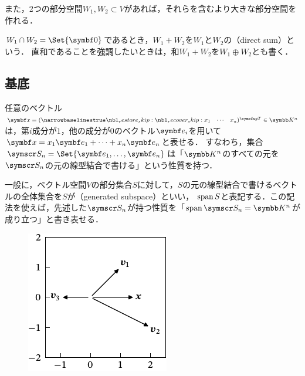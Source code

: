 \documentclass[../../main]{subfiles}
\begin{document}
また，2つの部分空間\(W_1,W_2\subset V\)があれば，それらを含むより大きな部分空間を作れる．


\(W_1\cap W_2=\Set{\zvec}\)であるとき，\(W_1+W_2\)を\(W_1\)と\(W_2\)の（direct sum）という．
直和であることを強調したいときは，和\(W_1+W_2\)を\(W_1\oplus W_2\)とも書く．

\subsection{基底}

任意のベクトル\(\vect{x}=\trps{\rowvect{x_1 & \cdots & x_n}}\in\numset{K}^n\)は，第\(i\)成分が\(1\)，他の成分が\(0\)のベクトル\(\vect{e}_i\)を用いて\(\vect{x}=x_1\vect{e}_1+\dots+x_n\vect{e}_n\)と表せる．
すなわち，集合\(\basis{S}_n=\Set{\vect{e}_1,\dots,\vect{e}_n}\)は「\(\numset{K}^n\)のすべての元を\(\basis{S}_n\)の元の線型結合で書ける」という性質を持つ．

一般に，ベクトル空間\(V\)の部分集合\(S\)に対して，\(S\)の元の線型結合で書けるベクトルの全体集合を\(S\)が（generated subspace）といい，
\(\operatorname{span} S\)と表記する．この記法を使えば，先述した\(\basis{S}_n\)が持つ性質を「\(\spannedby\basis{S}_n=\numset{K}^n\)が成り立つ」と書き表せる．

\begin{figure}
  \includegraphics{figures/linear_comb.pdf}
\end{figure}
\end{document}
